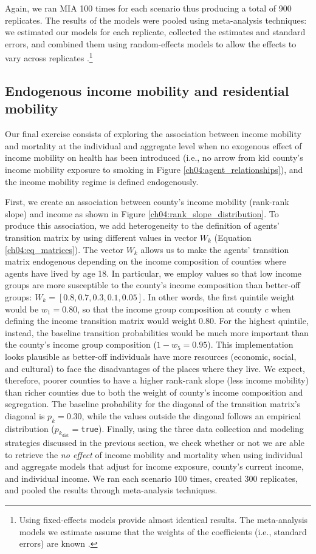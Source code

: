 \documentclass[class=article, crop=false, 12pt]{standalone}
\begin{document}
Again, we ran MIA 100 times for each scenario thus producing a total of 900 replicates. The results of the models were pooled using meta-analysis techniques: we estimated our models for each replicate, collected the estimates and standard errors, and  combined them using random-effects models to allow the effects to vary across replicates \citep{viechtbauer2010}.\footnote{Using fixed-effects models provide almost identical results. The meta-analysis models we estimate assume that the weights of the coefficients (i.e., standard errors) are known \citep{viechtbauer2010}.}

\subsection{Endogenous income mobility and residential mobility}

Our final exercise consists of exploring the association between income mobility and mortality at the individual and aggregate level when no exogenous effect of income mobility on health has been introduced (i.e., no arrow from kid county's income mobility exposure to smoking in Figure \ref{ch04:agent_relationships}), and the income mobility regime is defined endogenously. 

First, we create an association between county's income mobility (rank-rank slope) and income as shown in Figure \ref{ch04:rank_slope_distribution}. To produce this association, we add heterogeneity to the definition of agents' transition matrix by using different values in vector $W_k$ (Equation \ref{ch04:eq_matrices}). The vector $W_k$ allows us to make the agents' transition matrix endogenous depending on the income composition of counties where agents have lived by age 18. In particular, we employ values so that low income groups are more susceptible to the county's income composition than better-off groups: $W_k = [0.8, 0.7, 0.3, 0.1, 0.05]$. In other words, the first quintile weight would be $w_1 = 0.80$, so that the income group composition at county $c$ when defining the income transition matrix would weight 0.80. For the highest quintile, instead, the baseline transition probabilities would be much more important than the county's income group composition ($1 - w_5 = 0.95$). This implementation looks plausible as better-off individuals have more resources (economic, social, and cultural) to face the disadvantages of the places where they live. We expect, therefore, poorer counties to have a higher rank-rank slope (less income mobility) than richer counties due to both the weight of county's income composition and segregation. The baseline probability for the diagonal of the transition matrix's diagonal is $p_k=0.30$, while the values outside the diagonal follows an empirical distribution ($p_{k_{\text{dist}}} = $\texttt{true}). Finally, using the three data collection and modeling strategies discussed in the previous section, we check whether or not we are able to retrieve the \textit{no effect} of income mobility and mortality when using individual and aggregate models that adjust for income exposure, county's current income, and individual income. We ran each scenario 100 times, created 300 replicates, and pooled the results through meta-analysis techniques.
\end{document}
